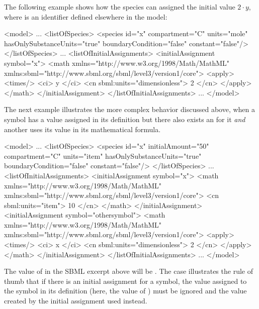 The following example shows how the species  can assigned
the initial value $2 \cdot y$, where  is an identifier
defined elsewhere in the model:

\begin{example}
<model>
    ...
    <listOfSpecies>
        <species id="x" compartment="C" units="mole"
                 hasOnlySubstanceUnits="true" boundaryCondition="false" constant="false"/>
    </listOfSpecies>
    ...
    <listOfInitialAssignments>
        <initialAssignment symbol="x">
            <math xmlns="http://www.w3.org/1998/Math/MathML"
                  xmlns:sbml="http://www.sbml.org/sbml/level3/version1/core">
                <apply>
                    <times/> 
                    <ci> y </ci> 
                    <cn sbml:units="dimensionless"> 2 </cn>
                </apply>
            </math>
        </initialAssignment>
    </listOfInitialAssignments>
    ...
</model>
\end{example}

The next example illustrates the more complex behavior discussed
above, when a symbol has a value assigned in its definition but
there also exists an \InitialAssignment for it \emph{and} another
\InitialAssignment uses its value in its mathematical formula.

\begin{example}
<model>
    ...
    <listOfSpecies>
        <species id="x" initialAmount="50" compartment="C" units="item"
                 hasOnlySubstanceUnits="true" boundaryCondition="false" constant="false"/>
    </listOfSpecies>
    ...
    <listOfInitialAssignments>
        <initialAssignment symbol="x">
            <math xmlns="http://www.w3.org/1998/Math/MathML"
                  xmlns:sbml="http://www.sbml.org/sbml/level3/version1/core">
                <cn sbml:units="item"> 10 </cn>
            </math>
        </initialAssignment>
        <initialAssignment symbol="othersymbol">
            <math xmlns="http://www.w3.org/1998/Math/MathML"
                  xmlns:sbml="http://www.sbml.org/sbml/level3/version1/core">
                <apply>
                    <times/>
                    <ci> x </ci>
                    <cn sbml:units="dimensionless"> 2 </cn>
                </apply>
            </math>
        </initialAssignment>
    </listOfInitialAssignments>
    ...
</model>
\end{example}

The value of  in the SBML excerpt above will be
.  The case illustrates the rule of thumb that if there is
an initial assignment for a symbol, the value assigned to the
symbol in its definition (here, the value of
) must be ignored and the value created by
the initial assignment used instead.


